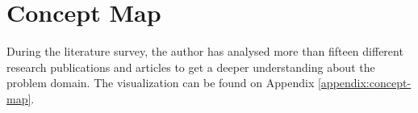 \section{Concept Map}

During the literature survey, the author has analysed more than fifteen different research publications and articles to get a deeper understanding about the problem domain. The visualization can be found on Appendix \ref{appendix:concept-map}.

